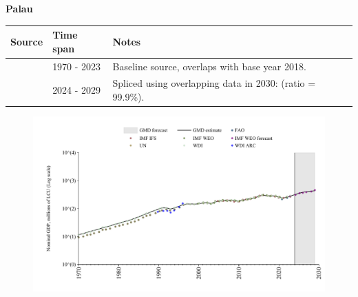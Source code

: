 \documentclass[12pt,a4paper,landscape]{article}
\begin{document}
\begin{adjustbox}{max totalsize={\paperwidth}{\paperheight},center}
\begin{minipage}[t][\textheight][t]{\textwidth}
\vspace*{0.5cm}
{}
\begin{center}
{\Large\bfseries Palau}
\end{center}
\vspace{0.5cm}
\begin{table}[H]
\centering
\small
\begin{tabular}{|l|l|l|}
\hline
\textbf{Source} & \textbf{Time span} & \textbf{Notes} \\
\hline
\rowcolor{white}\cite{WDI}& 1970 - 2023 &Baseline source, overlaps with base year 2018.\\
\rowcolor{lightgray}\cite{IMF_WEO_forecast}& 2024 - 2029 &Spliced using overlapping data in 2030: (ratio = 99.9\%).\\
\hline
\end{tabular}
\end{table}
\begin{figure}[H]
\centering
\includegraphics[width=\textwidth,height=0.6\textheight,keepaspectratio]{graphs/PLW_nGDP.pdf}
\end{figure}
\end{minipage}
\end{adjustbox}
\end{document}
